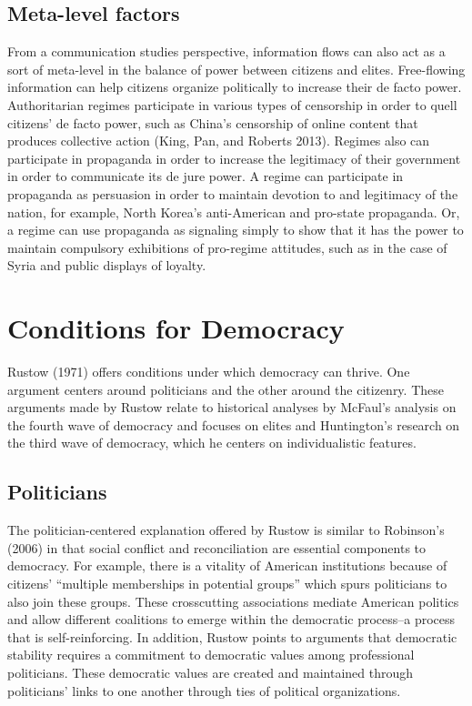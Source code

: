 \documentclass[12pt,]{article}
\begin{document}
\hypertarget{meta-level-factors}{%
\subsection{Meta-level factors}\label{meta-level-factors}}

From a communication studies perspective, information flows can also act
as a sort of meta-level in the balance of power between citizens and
elites. Free-flowing information can help citizens organize politically
to increase their de facto power. Authoritarian regimes participate in
various types of censorship in order to quell citizens' de facto power,
such as China's censorship of online content that produces collective
action (King, Pan, and Roberts 2013). Regimes also can participate in
propaganda in order to increase the legitimacy of their government in
order to communicate its de jure power. A regime can participate in
propaganda as persuasion in order to maintain devotion to and legitimacy
of the nation, for example, North Korea's anti-American and pro-state
propaganda. Or, a regime can use propaganda as signaling simply to show
that it has the power to maintain compulsory exhibitions of pro-regime
attitudes, such as in the case of Syria and public displays of loyalty.

\hypertarget{conditions-for-democracy}{%
\section{Conditions for Democracy}\label{conditions-for-democracy}}

Rustow (1971) offers conditions under which democracy can thrive. One
argument centers around politicians and the other around the citizenry.
These arguments made by Rustow relate to historical analyses by McFaul's
analysis on the fourth wave of democracy and focuses on elites and
Huntington's research on the third wave of democracy, which he centers
on individualistic features.

\hypertarget{politicians}{%
\subsection{Politicians}\label{politicians}}

The politician-centered explanation offered by Rustow is similar to
Robinson's (2006) in that social conflict and reconciliation are
essential components to democracy. For example, there is a vitality of
American institutions because of citizens' ``multiple memberships in
potential groups'' which spurs politicians to also join these groups.
These crosscutting associations mediate American politics and allow
different coalitions to emerge within the democratic process--a process
that is self-reinforcing. In addition, Rustow points to arguments that
democratic stability requires a commitment to democratic values among
professional politicians. These democratic values are created and
maintained through politicians' links to one another through ties of
political organizations.
\end{document}
